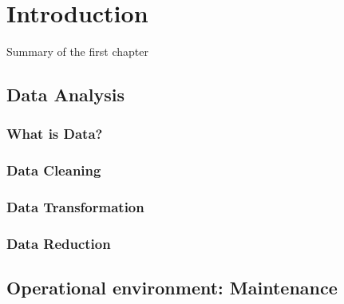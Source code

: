 \chapter{Introduction}

Summary of the first chapter

\section{Data Analysis}


\subsection{What is Data?}


\subsection{Data Cleaning}

\subsection{Data Transformation}

\subsection{Data Reduction}

\section{Operational environment: Maintenance}




